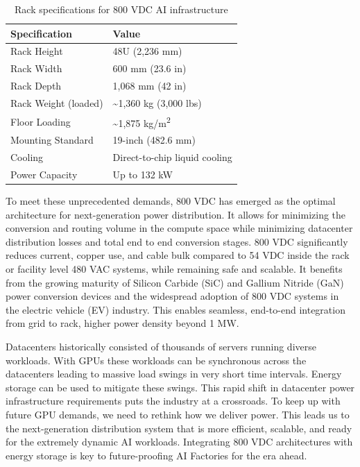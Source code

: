 \begin{table}[h]
\centering
\caption{Rack specifications for 800 VDC AI infrastructure}
\label{tab:rack-specs}
\begin{tabular}{ll}
\toprule
\textbf{Specification} & \textbf{Value} \\
\midrule
Rack Height & 48U (2,236 mm) \\
Rack Width & 600 mm (23.6 in) \\
Rack Depth & 1,068 mm (42 in) \\
Rack Weight (loaded) & \textasciitilde1,360 kg (3,000 lbs) \\
Floor Loading & \textasciitilde1,875 kg/m\textsuperscript{2} \\
Mounting Standard & 19-inch (482.6 mm) \\
Cooling & Direct-to-chip liquid cooling \\
Power Capacity & Up to 132 kW \\
\bottomrule
\end{tabular}
\end{table}

To meet these unprecedented demands, 800 VDC has emerged as the optimal architecture for next-generation power distribution. It allows for minimizing the conversion and routing volume in the compute space while minimizing datacenter distribution losses and total end to end conversion stages. 800 VDC significantly reduces current, copper use, and cable bulk compared to 54 VDC inside the rack or facility level 480 VAC systems, while remaining safe and scalable. It benefits from the growing maturity of Silicon Carbide (SiC) and Gallium Nitride (GaN) power conversion devices and the widespread adoption of 800 VDC systems in the electric vehicle (EV) industry. This enables seamless, end-to-end integration from grid to rack, higher power density beyond 1 MW.

Datacenters historically consisted of thousands of servers running diverse workloads. With GPUs these workloads can be synchronous across the datacenters leading to massive load swings in very short time intervals. Energy storage can be used to mitigate these swings. This rapid shift in datacenter power infrastructure requirements puts the industry at a crossroads. To keep up with future GPU demands, we need to rethink how we deliver power. This leads us to the next-generation distribution system that is more efficient, scalable, and ready for the extremely dynamic AI workloads. Integrating 800 VDC architectures with energy storage is key to future-proofing AI Factories for the era ahead.

